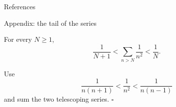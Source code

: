 \documentclass[night,charter,footer]{BeamerJS}
\begin{document}
\begin{frame}{References}
	\printbibliography
\end{frame}

\startappendix

\begin{frame}{Appendix: the tail of the series}
	\begin{prop}
		For every $N\geq1$,
		\[
			\frac{1}{N+1}<\sum_{n>N}\frac{1}{n^2}<\frac{1}{N}.
		\]
	\end{prop}
	\begin{proofbox}
		Use
		\[
			\frac{1}{n(n+1)}<\frac{1}{n^2}<\frac{1}{n(n-1)}
		\]
		and sum the two telescoping series. \hfill$\square$
	\end{proofbox}
\end{frame}

\stopappendix
\end{document}
